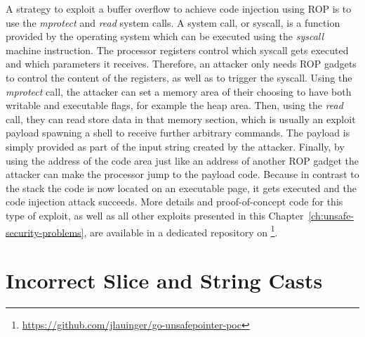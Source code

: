 A strategy to exploit a buffer overflow to achieve code injection using \acrshort{ROP} is to use the \textit{mprotect}
and \textit{read} system calls.
A system call, or syscall, is a function provided by the operating system which can be executed using the
\textit{syscall} machine instruction.
The processor registers control which syscall gets executed and which parameters it receives.
Therefore, an attacker only needs \acrshort{ROP} gadgets to control the content of the registers, as well as to trigger
the syscall.
Using the \textit{mprotect} call, the attacker can set a memory area of their choosing to have both writable and
executable flags, for example the heap area.
Then, using the \textit{read} call, they can read store data in that memory section, which is usually an exploit payload
spawning a shell to receive further arbitrary commands.
The payload is simply provided as part of the input string created by the attacker.
Finally, by using the address of the code area just like an address of another \acrshort{ROP} gadget the attacker can
make the processor jump to the payload code.
Because in contrast to the stack the code is now located on an executable page, it gets executed and the code injection
attack succeeds.
More details and proof-of-concept code for this type of exploit, as well as all other exploits presented in this
Chapter~\ref{ch:unsafe-security-problems}, are available in a dedicated repository on
\github{}\footnote{\url{https://github.com/jlauinger/go-unsafepointer-poc}}.



\section{Incorrect Slice and String Casts}\label{sec:unsafe-security-problems:slice-casts}

